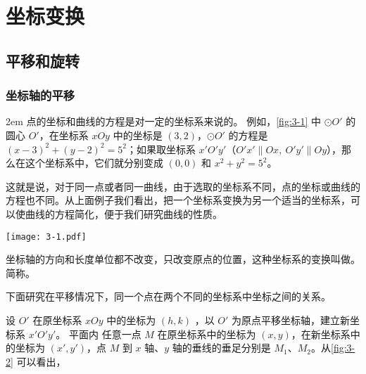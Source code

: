 \chapter{坐标变换}
\section{平移和旋转}
\subsection{坐标轴的平移}\label{subsec:axis_translation}
\noindent
\begin{minipage}{0.58\linewidth}\parindent2em
点的坐标和曲线的方程是对一定的坐标系来说的。
例如，\cref{fig:3-1} 中 $\odot O'$ 的圆心 $O'$，在坐标系 $xOy$ 中的坐标是 $(3,2)$，$\odot O'$ 的方程是 $(x-3)^2+(y-2)^2=5^2$；如果取坐标系 $x'O'y'$（$O'x'\parallel Ox,\ O'y'\parallel Oy$），那么在这个坐标系中，它们就分别变成 $(0,0)$ 和 $x^2+y^2=5^2$。

这就是说，对于同一点或者同一曲线，由于选取的坐标系不同，点的坐标或曲线的方程也不同。从上面例子我们看出，把一个坐标系变换为另一个适当的坐标系，可以使曲线的方程简化，便于我们研究曲线的性质。
\end{minipage}\hfill
\begin{minipage}{0.37\linewidth}\centering
\begin{figurehere}
  \texttt{[image: 3-1.pdf]}
  \caption{}\label{fig:3-1}
\end{figurehere}
\end{minipage}

\medskip
坐标轴的方向和长度单位都不改变，只改变原点的位置，这种坐标系的变换叫做。
简称。

下面研究在平移情况下，同一个点在两个不同的坐标系中坐标之间的关系。


设 $O'$ 在原坐标系 $xOy$ 中的坐标为 $(h,k)$ ，以 $O'$ 为原点平移坐标轴，建立新坐标系 $x'O'y'$。
平面内 任意一点 $M$ 在原坐标系中的坐标为 $(x,y)$，在新坐标系中的坐标为 $(x',y')$，点 $M$ 到 $x$ 轴、$y$ 轴的垂线的垂足分别是 $M_1$、$M_2$。从\cref{fig:3-2} 可以看出，

